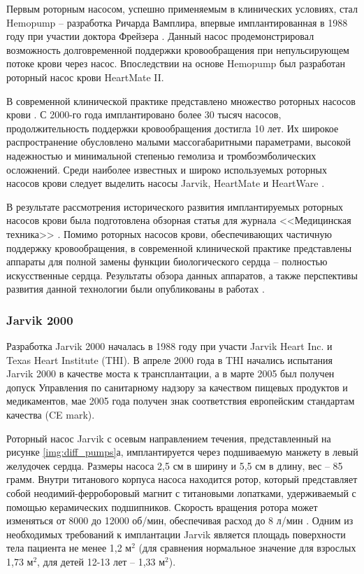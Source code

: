 Первым роторным насосом, успешно применяемым в клинических условиях, стал Hemopump -- разработка Ричарда Вамплира, впервые имплантированная в 1988 году при участии доктора Фрейзера \cite{frazier2017invited}. Данный насос продемонстрировал возможность долговременной поддержки кровообращения при непульсирующем потоке крови через насос. Впоследствии на основе Hemopump был разработан роторный насос крови HeartMate II. 

В современной клинической практике представлено множество роторных насосов крови \cite{Patel2014667}. С 2000-го года имплантировано более 30 тысяч насосов, продолжительность поддержки кровообращения достигла 10 лет. Их широкое распространение обусловлено малыми массогабаритными параметрами, высокой надежностью и минимальной степенью гемолиза и тромбоэмболических осложнений. Среди наиболее известных и широко используемых роторных насосов крови следует выделить насосы Jarvik, HeartMate и HeartWare \cite{frazier2017invited, intermacs2017}. 

В результате рассмотрения исторического развития имплантируемых роторных насосов крови была подготовлена обзорная статья для журнала <<Медицинская техника>> \cite{mt6_2014}. Помимо роторных насосов крови, обеспечивающих частичную поддержку кровообращения, в современной клинической практике представлены аппараты для полной замены функции биологического сердца -- полностью искусственные сердца. Результаты обзора данных аппаратов, а также перспективы развития данной технологии были опубликованы в работах \cite{mt4_2015, mt5_2015}.

\subsubsection*{Jarvik 2000}

Разработка Jarvik 2000 началась в 1988 году при участи Jarvik Heart Inc. и Texas Heart Institute (THI). В апреле 2000 года в THI начались испытания Jarvik 2000 в качестве моста к трансплантации, а в марте 2005 был получен допуск Управления по санитарному надзору за качеством пищевых продуктов и медикаментов, мае 2005 года получен знак соответствия европейским стандартам качества (CE mark). 

Роторный насос Jarvik с осевым направлением течения, представленный на рисунке \ref{img:diff_pumps}а, имплантируется через подшиваемую манжету в левый желудочек сердца. Размеры насоса 2,5 см в ширину и 5,5 см в длину, вес -- 85 грамм. Внутри титанового корпуса насоса находится ротор, который представляет собой неодимий-ферроборовый магнит с титановыми лопатками, удерживаемый с помощью керамических подшипников. Скорость вращения ротора может изменяться от 8000 до 12000 об/мин, обеспечивая расход до 8 л/мин \cite{Westaby13101998, Healy20151794, Jarvik_cone_bearing_2013}. Одним из необходимых требований к имплантации Jarvik является площадь поверхности тела пациента не менее 1,2 м$^2$ (для сравнения нормальное значение для взрослых 1,73 м$^2$, для детей 12-13 лет -- 1,33 м$^2$).

